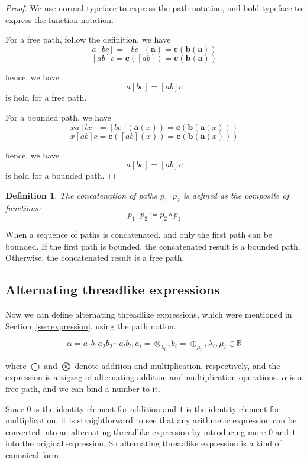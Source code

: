 \documentclass{article}
\newtheorem{definition}{Definition}
\numberwithin{definition}{section}
\numberwithin{lemma}{section}
\numberwithin{proposition}{section}
\numberwithin{corollary}{section}
\numberwithin{theorem}{section}
\begin{document}
\begin{proof}
    We use normal typeface to express the path notation, and bold typeface to express the function notation.

    For a free path, follow the definition, we have
    \[a [b c] = [b c](\mathbf{a}) = \mathbf{c}(\mathbf{b}(\mathbf{a}))\]
    \[[a b] c = \mathbf{c}([a b]) = \mathbf{c}(\mathbf{b}(\mathbf{a}))\]

    hence, we have
    \[a [b c] = [a b] c\]
    is hold for a free path.

    For a bounded path, we have
    \[x a [b c] = [b c](\mathbf{a}(x)) = \mathbf{c}(\mathbf{b}(\mathbf{a}(x)))\]
    \[x [a b] c = \mathbf{c}([a b](x)) = \mathbf{c}(\mathbf{b}(\mathbf{a}(x)))\]

    hence, we have
    \[a [b c] = [a b] c\]
    is hold for a bounded path.

\end{proof}

\begin{definition}\label{definition:concatenate}
The concatenation of paths $p_1 \cdot p_2$ is defined as the composite of functions:
\[p_1 \cdot p_2 \coloneqq p_2 \circ p_1 \]
\end{definition}

When a sequence of paths is concatenated, and only the first path can be bounded.
If the first path is bounded, the concatenated result is a bounded path.
Otherwise, the concatenated result is a free path.

\subsection{Alternating threadlike expressions}\label{subsec:alternating}

Now we can define alternating threadlike expressions, which were mentioned in Section~\ref{sec:expression}, using the path notion.

\begin{equation}\label{eq:alternative}
\alpha = a_1 b_1 a_2 b_2 \cdots a_l b_l, a_i = \otimes_{\lambda_i}, b_i = \oplus_{\mu_i}, \lambda_i, \mu_i \in \mathbb{R}
\end{equation}

where $\bigoplus$ and $\bigotimes$ denote addition and multiplication, respectively,
and the expression is a zigzag of alternating addition and multiplication operations.
$\alpha$ is a free path, and we can bind a number to it.

Since $0$ is the identity element for addition and $1$ is the identity element for multiplication,
it is straightforward to see that any arithmetic expression can be converted into an alternating threadlike expression
by introducing more $0$ and $1$ into the original expression.
So alternating threadlike expression is a kind of canonical form.
\end{document}
